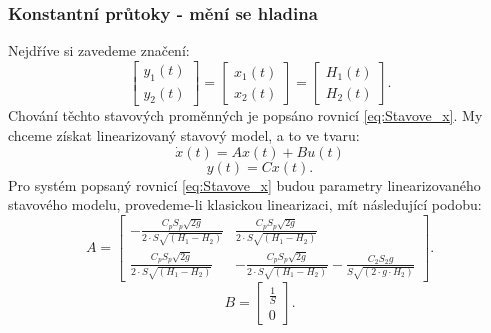 \documentclass[a4paper,11pt]{article}
\begin{document}
\subsubsection{Konstantní průtoky - mění se hladina}
\label{sec:2A}
Nejdříve si zavedeme značení:
\begin{equation}
\left [\begin{array}{cc}
y_{1}\left ( t \right ) \\
y_{2}\left ( t \right )
\end{array}\right ] = 
\left [\begin{array}{cc}
x_{1}\left ( t \right )\\
x_{2}\left ( t \right )\end{array}\right ]=
\left [\begin{array}{cc}
H_{1}\left ( t \right )\\
H_{2}\left ( t \right )\end{array}\right ].
\end{equation}
Chování těchto stavových proměnných je popsáno rovnicí \ref{eq:Stavove_x}. My chceme získat linearizovaný stavový model, a to ve tvaru:
\begin{equation}
\dot{x}\left ( t \right )=Ax\left( t \right )+Bu \left( t \right)\end{equation}
\begin{equation}
y\left ( t \right )=Cx\left( t \right ).
\end{equation}
Pro systém popsaný rovnicí \ref{eq:Stavove_x} budou parametry  linearizovaného stavového modelu, provedeme-li klasickou linearizaci, mít následující podobu:
\begin{equation}\label{eq:linearizace_zakladni_vztah}A = 
\left [\begin{array}{cc}
-\frac{C_{p}S_{p}\sqrt{2g}}{2\cdot S\sqrt{\left ( H_{1}-H_{2} \right )}} & \frac{C_{p}S_{p}\sqrt{2g}}{2\cdot S\sqrt{\left ( H_{1}-H_{2} \right )}} \\
\frac{C_{p}S_{p}\sqrt{2g}}{2\cdot S\sqrt{\left ( H_{1}-H_{2} \right )}} & -\frac{C_{p}S_{p}\sqrt{2g}}{2\cdot S\sqrt{\left ( H_{1}-H_{2} \right )}}-\frac{C_{2}S_{2}g}{S\sqrt{\left ( 2\cdot g\cdot H_{2} \right )}}
\end{array}\right ].
\end{equation}
\begin{equation}B = 
\left [\begin{array}{cc}
\frac{1}{S}\\
0
\end{array}\right ].
\end{equation}
\end{document}
